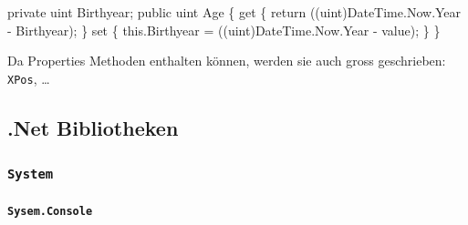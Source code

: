\documentclass[
  9pt,
  a4paperpaper,
  DIV=11]{scrartcl}
\let\oldparagraph\paragraph
\renewcommand{\paragraph}[1]{\oldparagraph{#1}\mbox{}}
\newenvironment{Shaded}{}{}
\newcommand{\DataTypeTok}[1]{\textcolor[rgb]{0.84,0.23,0.29}{#1}}
\newcommand{\FunctionTok}[1]{\textcolor[rgb]{0.44,0.26,0.76}{#1}}
\newcommand{\KeywordTok}[1]{\textcolor[rgb]{0.84,0.23,0.29}{#1}}
\newcommand{\NormalTok}[1]{\textcolor[rgb]{0.14,0.16,0.18}{#1}}
\newcommand{\OperatorTok}[1]{\textcolor[rgb]{0.14,0.16,0.18}{#1}}
\numberwithin{equation}{section}
\begin{document}
\begin{multicols}{2}
\begin{Shaded}
\begin{Highlighting}[]
\KeywordTok{private} \DataTypeTok{uint}\NormalTok{ Birthyear}\OperatorTok{;}
\KeywordTok{public} \DataTypeTok{uint}\NormalTok{ Age }\OperatorTok{\{}
  \KeywordTok{get} \OperatorTok{\{} 
    \KeywordTok{return} \OperatorTok{((}\DataTypeTok{uint}\OperatorTok{)}\NormalTok{DateTime}\OperatorTok{.}\FunctionTok{Now}\OperatorTok{.}\FunctionTok{Year} \OperatorTok{{-}}\NormalTok{ Birthyear}\OperatorTok{);} 
    \OperatorTok{\}}
  \KeywordTok{set} \OperatorTok{\{} 
    \KeywordTok{this}\OperatorTok{.}\FunctionTok{Birthyear} \OperatorTok{=} \OperatorTok{((}\DataTypeTok{uint}\OperatorTok{)}\NormalTok{DateTime}\OperatorTok{.}\FunctionTok{Now}\OperatorTok{.}\FunctionTok{Year} \OperatorTok{{-}}\NormalTok{ value}\OperatorTok{);} 
    \OperatorTok{\}}
\OperatorTok{\}}
\end{Highlighting}
\end{Shaded}

\begin{tcolorbox}[enhanced jigsaw, arc=.35mm, toprule=.15mm, leftrule=.75mm, toptitle=1mm, colbacktitle=quarto-callout-important-color!10!white, title=\textcolor{quarto-callout-important-color}{\faExclamation}\hspace{0.5em}{Wichtig}, opacityback=0, titlerule=0mm, coltitle=black, opacitybacktitle=0.6, bottomtitle=1mm, colback=white, colframe=quarto-callout-important-color-frame, left=2mm, breakable, bottomrule=.15mm, rightrule=.15mm]

Da Properties Methoden enthalten können, werden sie auch gross
geschrieben: \texttt{XPos}, \ldots{}

\end{tcolorbox}

\hypertarget{net-bibliotheken}{%
\subsection{.Net Bibliotheken}\label{net-bibliotheken}}

\hypertarget{system}{%
\subsubsection{\texorpdfstring{\texttt{System}}{System}}\label{system}}

\hypertarget{sysem.console}{%
\paragraph{\texorpdfstring{\texttt{Sysem.Console}}{Sysem.Console}}\label{sysem.console}}


\end{multicols}
\end{document}
